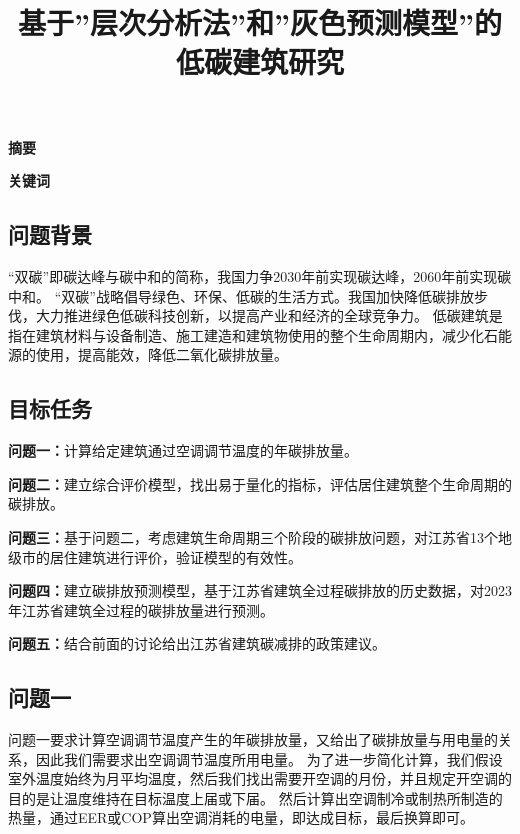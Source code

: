 \documentclass[a4paper, 12pt]{article}
\numberwithin{equation}{section}
\begin{document}
    \title{基于''层次分析法''和''灰色预测模型''的低碳建筑研究}
    \author{}
    \date{}
    \maketitle

    \centerline{\textbf{\LARGE{摘要}}}

    \textbf{\large{关键词}}

    {}
        \subsection{问题背景}
        “双碳”即碳达峰与碳中和的简称，我国力争2030年前实现碳达峰，2060年前实现碳中和。
        “双碳”战略倡导绿色、环保、低碳的生活方式。我国加快降低碳排放步伐，大力推进绿色低碳科技创新，以提高产业和经济的全球竞争力。
        低碳建筑是指在建筑材料与设备制造、施工建造和建筑物使用的整个生命周期内，减少化石能源的使用，提高能效，降低二氧化碳排放量。

        \subsection{目标任务}
            \textbf{问题一：}计算给定建筑通过空调调节温度的年碳排放量。

            \textbf{问题二：}建立综合评价模型，找出易于量化的指标，评估居住建筑整个生命周期的碳排放。

            \textbf{问题三：}基于问题二，考虑建筑生命周期三个阶段的碳排放问题，对江苏省13个地级市的居住建筑进行评价，验证模型的有效性。

            \textbf{问题四：}建立碳排放预测模型，基于江苏省建筑全过程碳排放的历史数据，对2023年江苏省建筑全过程的碳排放量进行预测。

            \textbf{问题五：}结合前面的讨论给出江苏省建筑碳减排的政策建议。


    {}
        \subsection{问题一}
            问题一要求计算空调调节温度产生的年碳排放量，又给出了碳排放量与用电量的关系，因此我们需要求出空调调节温度所用电量。
            为了进一步简化计算，我们假设室外温度始终为月平均温度，然后我们找出需要开空调的月份，并且规定开空调的目的是让温度维持在目标温度上届或下届。
            然后计算出空调制冷或制热所制造的热量，通过EER或COP算出空调消耗的电量，即达成目标，最后换算即可。
\end{document}
